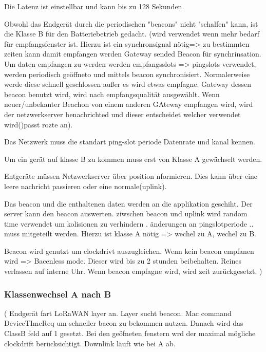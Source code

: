\documentclass[a4paper,12pt]{article}
\begin{document}
            Die Latenz ist einstellbar und kann bis zu 128 Sekunden.

            Obwohl das Endgerät durch die periodischen "beacons" nicht "schalfen" kann, ist die Klasse B für den Batteriebetrieb gedacht.
            \cite{LoRaSpec}(wird verwendet wenn mehr bedarf für empfangsfenster ist. Hierzu ist ein synchronsignal nötig=> zu bestimmten zeiten kann damit empfangen werden
                Gateway sended Beacon für synchrinsation. Um daten empfangen zu werden werden empfangsslots => pingslots verwendet, werden periodisch geöffneto und mittels beacon synchronisiert. Normalerweise werde diese schnell geschlossen außer es wird etwas empfagne.
                Gateway dessen beacon benutzt wird, wird nach empfangsqualität ausgewählt. Wenn neuer/unbekanter Beachon von einem anderen GAteway empfangen wird, wird der netzwerkserver benachrichted und dieser entscheidet welcher verwendet wird()passt rozte an).

                Das Netzwerk muss die standart ping-slot periode Datenrate und kanal kennen.

                Um ein gerät auf klasse B zu kommen muss erst von Klasse A gewächselt werden.

                Entgeräte müssen Netzwerkserver über position nformieren. Dies kann über eine leere nachricht passieren oder eine normale(uplink).
                
                Das beacon und die enthaltenen daten werden an die applikation geschiht. Der server kann den beacon auswerten. ziwschen beacon und uplink wird random time verwendet um kolisionen zu verhindern .
                änderungen an pingslotperiode .. muss mitgeteilt werden. Hierzu ist klasse A nötig => wechel zu A, wechel zu B.
            
                Beacon wird genutzt um clockdrivt auszugleichen. Wenn kein beacon empfanen wird  => Bacenless mode. Dieser wird bis zu 2 stunden beibehalten. Reines verlassen auf interne Uhr. Wenn beacon empfagne wird, wird zeit zurückgesetzt.
            )
            \subsubsection{Klassenwechsel A nach B}
                \cite{LoRaSpec}(
                    Endgerät fart LoRaWAN layer an. Layer sucht beacon. Mac command DeviceTImeReq um schneller bacon zu bekommen nutzen. Danach wird das ClassB feld auf 1 gesetzt. Bei den geöfneten fenstern wrd der maximal mögliche clockdrift berücksichtigt.
                    Downlink läuft wie bei A ab.
\end{document}
